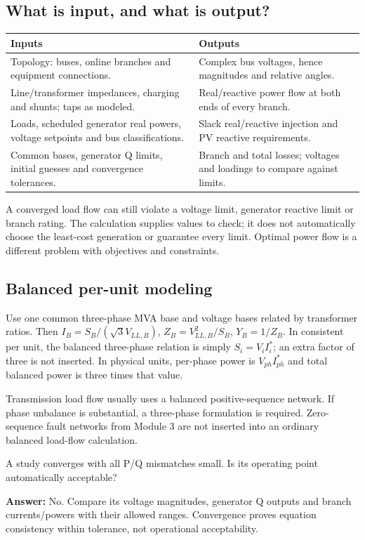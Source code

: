\documentclass[11pt,a4paper]{article}
\newenvironment{Caution}[1]{\begin{tcolorbox}[colback=warm,colframe=rust,coltitle=white,title={#1}]}{\end{tcolorbox}}
\newcommand{\checkq}[2]{\begin{tcolorbox}[breakable=false,colback=pale,colframe=teal,coltitle=white,title={Check your understanding}]#1\par\textbf{Answer:} #2\end{tcolorbox}}
\begin{document}
\subsection{What is input, and what is output?}
\begin{center}\small\begin{tabularx}{\textwidth}{Y Y}
\toprule Inputs & Outputs\\\midrule
Topology: buses, online branches and equipment connections. & Complex bus voltages, hence magnitudes and relative angles.\\
Line/transformer impedances, charging and shunts; taps as modeled. & Real/reactive power flow at both ends of every branch.\\
Loads, scheduled generator real powers, voltage setpoints and bus classifications. & Slack real/reactive injection and PV reactive requirements.\\
Common bases, generator Q limits, initial guesses and convergence tolerances. & Branch and total losses; voltages and loadings to compare against limits.\\\bottomrule
\end{tabularx}\end{center}
\begin{Caution}{Solving equations is different from enforcing limits}
A converged load flow can still violate a voltage limit, generator reactive limit or branch rating. The calculation supplies values to check; it does not automatically choose the least-cost generation or guarantee every limit. Optimal power flow is a different problem with objectives and constraints.
\end{Caution}
\subsection{Balanced per-unit modeling}
Use one common three-phase MVA base and voltage bases related by transformer ratios. Then $I_B=S_B/(\sqrt3V_{LL,B})$, $Z_B=V_{LL,B}^2/S_B$, $Y_B=1/Z_B$. In consistent per unit, the balanced three-phase relation is simply $S_i=V_iI_i^*$; an extra factor of three is not inserted. In physical units, per-phase power is $V_{ph}I_{ph}^*$ and total balanced power is three times that value.

Transmission load flow usually uses a balanced positive-sequence network. If phase unbalance is substantial, a three-phase formulation is required. Zero-sequence fault networks from Module 3 are not inserted into an ordinary balanced load-flow calculation.
\checkq{A study converges with all P/Q mismatches small. Is its operating point automatically acceptable?}{No. Compare its voltage magnitudes, generator Q outputs and branch currents/powers with their allowed ranges. Convergence proves equation consistency within tolerance, not operational acceptability.}
\end{document}
